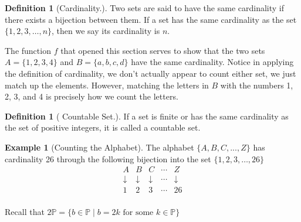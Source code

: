 \documentclass[10pt,]{book}
\theoremstyle{plain}
\theoremstyle{definition}
\newtheorem{definition}[theorem]{Definition}
\theoremstyle{definition}
\newtheorem{example}[theorem]{Example}
\theoremstyle{definition}
\begin{document}
\begin{definition}[Cardinality.]\label{def-cardinality}
\label{notation-4}
Two sets are said to have the same cardinality if there exists a bijection between them. If a set has the same cardinality as the set \(\{1,2,3,\ldots , n\}\), then we say its cardinality is \(n\).  %
\end{definition}
\par
The function \(f\) that opened this section serves to show that the two sets \(A=\{1, 2, 3, 4\}\) and \(B=\{a, b, c, d\}\) have the same cardinality. Notice in applying the definition of cardinality, we don't actually appear to count either set, we just match up the elements. However, matching the letters in \(B\) with the numbers 1, 2, 3, and 4 is precisely how we count the letters.%
\begin{definition}[ Countable Set.]\label{def-countable-set.}
If a set is finite or has the same cardinality as the set of positive integers, it is called a countable set.%
\end{definition}
\begin{example}[Counting the Alphabet]\label{ex-the-alphabet}
 The alphabet \(\{A, B, C, . . . , Z\}\) has cardinality 26 through the following bijection into the set \(\{1,2,3,\ldots ,26\}\)
\begin{equation*}
\begin{array}{ccccc}
 A & B & C & \cdots  & Z \\
 \downarrow  & \downarrow  & \downarrow  & \cdots  & \downarrow  \\
 1 & 2 & 3 & \cdots  & 26 \\
\end{array}
\end{equation*}%
\end{example}
\par
Recall that \(2\mathbb{P}= \{b\in \mathbb{P} \mid b= 2k \textrm{ for some } k \in \mathbb{P} \}\)%
\end{document}
